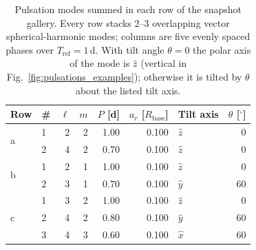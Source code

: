 \begin{table}
\centering
\caption{Pulsation modes summed in each row of the snapshot gallery. Every row stacks 2--3 overlapping vector spherical-harmonic modes; columns are five evenly spaced phases over $T_{\mathrm{ref}} = 1\,\mathrm{d}$. With tilt angle $\theta = 0$ the polar axis of the mode is $\hat z$ (vertical in Fig.~\ref{fig:pulsations_examples}); otherwise it is tilted by $\theta$ about the listed tilt axis.}
\label{tab:pulsation_snapshot_modes}
\begin{tabular}{@{}llrrrrlr@{}}
\toprule
Row & \# & $\ell$ & $m$ & $P$ [d] & $a_r$ [$R_{\mathrm{base}}$] & Tilt axis & $\theta$ [$^\circ$] \\
\midrule
\multirow{2}{*}{a} & 1 & 2 & 2 & 1.00 & 0.100 & $\hat z$ & 0 \\
 & 2 & 4 & 2 & 0.70 & 0.100 & $\hat z$ & 0 \\
\midrule
\multirow{2}{*}{b} & 1 & 2 & 1 & 1.00 & 0.100 & $\hat z$ & 0 \\
 & 2 & 3 & 1 & 0.70 & 0.100 & $\hat y$ & 60 \\
\midrule
\multirow{3}{*}{c} & 1 & 3 & 2 & 1.00 & 0.100 & $\hat z$ & 0 \\
 & 2 & 4 & 2 & 0.80 & 0.100 & $\hat y$ & 60 \\
 & 3 & 4 & 3 & 0.60 & 0.100 & $\hat x$ & 60 \\
\bottomrule
\end{tabular}
\end{table}

